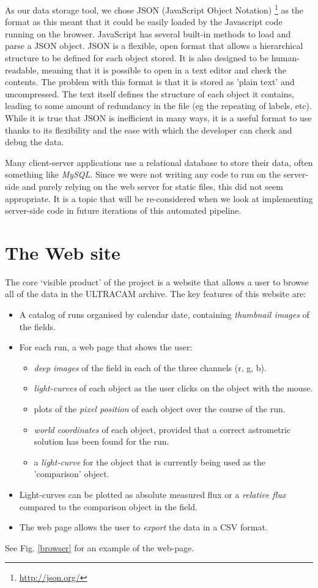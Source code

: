 As our data storage tool, we chose JSON (JavaScript Object Notation) \footnote{\url{http://json.org/}} as the format as this meant that it could be easily loaded by the Javascript code running on the browser. JavaScript has several built-in methods to load and parse a JSON object. JSON is a flexible, open format that allows a hierarchical structure to be defined for each object stored. It is also designed to be human-readable, meaning that it is possible to open in a text editor and check the contents. The problem with this format is that it is stored as 'plain text' and uncompressed. The text itself defines the structure of each object it contains, leading to some amount of redundancy in the file (eg the repeating of labels, etc). While it is true that JSON is inefficient in many ways, it is a useful format to use thanks to its flexibility and the ease with which the developer can check and debug the data. 

Many client-server applications use a relational database to store their data, often something like \emph{MySQL}. Since we were not writing any code to run on the server-side and purely relying on the web server for static files, this did not seem appropriate. It is a topic that will be re-considered when we look at implementing server-side code in future iterations of this automated pipeline. 

\section{The Web site}
The core `visible product' of the project is a website that allows a user to browse all of the data in the ULTRACAM archive. The key features of this website are:

\begin{itemize}
	\item A catalog of runs organised by calendar date, containing \emph{thumbnail images} of the fields.
	\item For each run, a web page that shows the user:
	\begin{itemize}
		\item \emph{deep images} of the field in each of the three channels (r, g, b).
		\item \emph{light-curves} of each object as the user clicks on the object with the mouse. 
		\item plots of the \emph{pixel position} of each object over the course of the run.
		\item \emph{world coordinates} of each object, provided that a correct astrometric solution has been found for the run. 
		\item a \emph{light-curve} for the object that is currently being used as the 'comparison' object. 
	\end{itemize}
	\item Light-curves can be plotted as absolute measured flux or a \emph{relative flux} compared to the comparison object in the field. 
	\item The web page allows the user to \emph{export} the data in a CSV format.
	
\end{itemize}
See Fig. \ref{browser} for an example of the web-page. 


